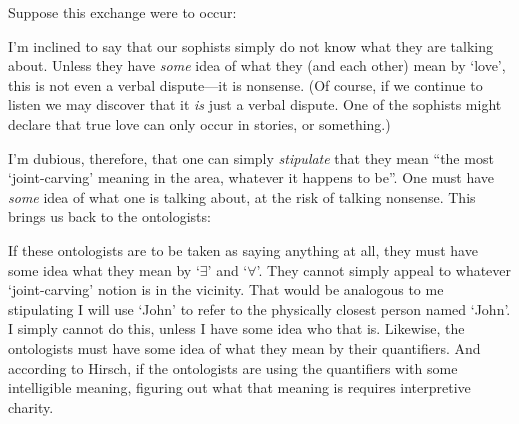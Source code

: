 \documentclass[11pt]{article}
\begin{document}
\begin{spacing}{1.25}
Suppose this exchange were to occur:





I'm inclined to say that our sophists simply do not know what they are
talking about.  Unless they have {\em some} idea of what they (and
each other) mean by `love', this is not even a verbal dispute---it is
nonsense.  (Of course, if we continue to listen we may discover that
it {\em is} just a verbal dispute.  One of the sophists might declare that
true love can only occur in stories, or something.)

I'm dubious, therefore, that one can simply {\em stipulate} that they
mean ``the most `joint-carving' meaning in the area, whatever it
happens to be''.  One must have {\em some} idea of what one is talking
about, at the risk of talking nonsense.  This brings us back to the
ontologists:





If these ontologists are to be taken as saying anything at all, they
must have some idea what they mean by `$\exists$' and `$\forall$'.
They cannot simply appeal to whatever `joint-carving' notion is in the
vicinity.  That would be analogous to me stipulating I will use `John'
to refer to the physically closest person named `John'.  I simply
cannot do this, unless I have some idea who that is.  Likewise, the
ontologists must have some idea of what they mean by their
quantifiers.  And according to Hirsch, if the ontologists are using
the quantifiers with some intelligible meaning, figuring out what that
meaning is requires interpretive charity.


\end{spacing}
\end{document}
